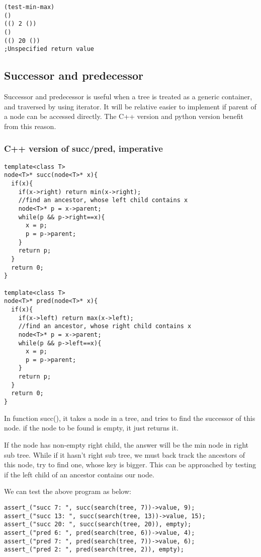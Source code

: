 \documentclass{article}
\begin{document}
\begin{verbatim}
(test-min-max)
()
(() 2 ())
()
(() 20 ())
;Unspecified return value
\end{verbatim}

\subsection{Successor and predecessor}

Successor and predecessor is useful when a tree is treated as a generic container,
and traversed by using iterator. It will be relative easier to implement if parent of
a node can be accessed directly. The C++ version and python version benefit from
this reason.

\subsubsection*{C++ version of succ/pred, imperative}

\lstset{language=C++}
\begin{lstlisting}
template<class T>
node<T>* succ(node<T>* x){
  if(x){
    if(x->right) return min(x->right);
    //find an ancestor, whose left child contains x
    node<T>* p = x->parent;
    while(p && p->right==x){
      x = p;
      p = p->parent;
    }
    return p;
  }
  return 0;
}

template<class T>
node<T>* pred(node<T>* x){
  if(x){
    if(x->left) return max(x->left);
    //find an ancestor, whose right child contains x
    node<T>* p = x->parent;
    while(p && p->left==x){
      x = p;
      p = p->parent;
    }
    return p;
  }
  return 0;
}
\end{lstlisting}

In function succ(), it takes a node in a tree, and tries to find the successor
of this node. if the node to be found is empty, it just returns it.

If the node has non-empty right child, the answer will be the min node in right
sub tree. While if it hasn't right sub tree, we must back track the ancestors 
of this node, try to find one, whose key is bigger. This can be approached 
by testing if the left child of an ancestor contains our node.

We can test the above program as below:

\begin{lstlisting}
assert_("succ 7: ", succ(search(tree, 7))->value, 9);
assert_("succ 13: ", succ(search(tree, 13))->value, 15);
assert_("succ 20: ", succ(search(tree, 20)), empty);
assert_("pred 6: ", pred(search(tree, 6))->value, 4);
assert_("pred 7: ", pred(search(tree, 7))->value, 6);
assert_("pred 2: ", pred(search(tree, 2)), empty);
\end{lstlisting}
\end{document}
